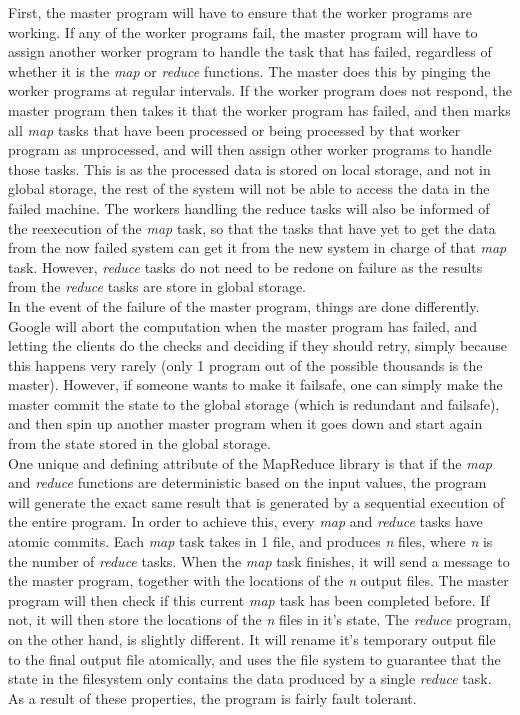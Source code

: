 \documentclass[]{article}
\begin{document}
First, the master program will have to ensure that  the worker programs are working. If any of the worker programs fail, the master program will have to assign another worker program to handle the task that has failed, regardless of whether it is the \emph{map} or \emph{reduce} functions. The master does this by pinging the worker programs at regular intervals. If the worker program does not respond, the master program then takes it that the worker program has failed, and then marks all \emph{map} tasks that have been processed or being processed by that worker program as unprocessed, and will then assign other worker programs to handle those tasks. This is as the processed data is stored on local storage, and not in global storage, the rest of the system will not be able to access the data in the failed machine. The workers handling the reduce tasks will also be informed of the reexecution of the \emph{map} task, so that the tasks that have yet to get the data from the now failed system can get it from the new system in charge of that \emph{map} task. However, \emph{reduce} tasks do not need to be redone on failure as the results from the \emph{reduce} tasks are store in global storage.\\

In the event of the failure of the master program, things are done differently. Google will abort the computation when the master program has failed, and letting the clients do the checks and deciding if they should retry, simply because this happens very rarely (only 1 program out of the possible thousands is the master). However, if someone wants to make it failsafe, one can simply make the master commit the state to the global storage (which is redundant and failsafe), and then spin up another master program when it goes down and start again from the state stored in the global storage.\\

One unique and defining attribute of the MapReduce library is that if the \emph{map} and \emph{reduce} functions are deterministic based on the input values, the program will generate the exact same result that is generated by a sequential execution of the entire program. In order to achieve this, every \emph{map} and \emph{reduce} tasks have atomic commits. Each \emph{map} task takes in 1 file, and produces \emph{n} files, where \emph{n} is the number of \emph{reduce} tasks. When the \emph{map} task finishes, it will send a message to the master program, together with the locations of the \emph{n} output files. The master program will then check if this current \emph{map} task has been completed before. If not, it will then store the locations of the \emph{n} files in it's state. The \emph{reduce} program, on the other hand, is slightly different. It will rename it's temporary output file to the final output file atomically, and uses the file system to guarantee that the state in the filesystem only contains the data produced by a single \emph{reduce} task. As a result of these properties, the program is fairly fault tolerant.\\
\end{document}
